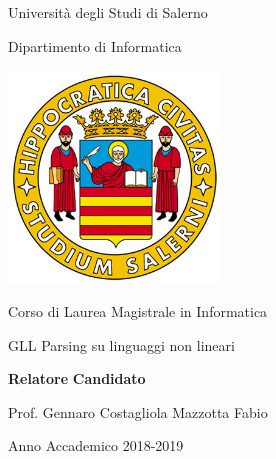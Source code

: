 %
\begin{titlepage}
\begin{center}
	{\LARGE Università degli Studi di Salerno}\par
	\vspace{0.5cm}
	{\Large Dipartimento di Informatica}\par
	\vspace{1cm}
	\includegraphics[height=160pt]{logounisa.png}\par
	\vspace{1cm}
	{\Large Corso di Laurea Magistrale in Informatica}\par
	\vspace{2cm}
	{\Huge GLL Parsing su linguaggi non lineari}\par
	\vspace{2cm}
\end{center}
\begin{flushleft}
	{\large\textbf{Relatore}}
	\hspace{8cm}
	{\large\textbf{Candidato}}\par
	\vspace{0.1cm}
	{\large Prof. Gennaro Costagliola}
	\hspace{4.5cm}
	{\large Mazzotta Fabio}%
\end{flushleft}	
	\vspace{3.5cm}
\begin{center}
	{\large Anno Accademico 2018-2019}
\end{center}
\end{titlepage}
%
